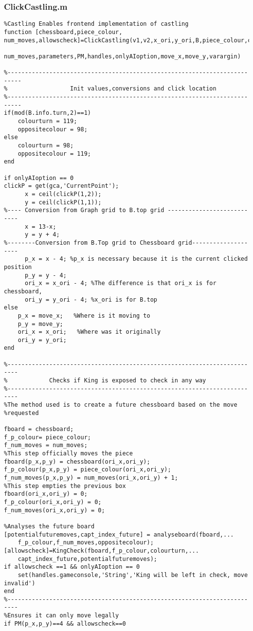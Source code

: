 \documentclass{article}
\begin{document}
\subsubsection{ClickCastling.m}
\begin{lstlisting}
%Castling Enables frontend implementation of castling
function [chessboard,piece_colour, num_moves,allowscheck]=ClickCastling(v1,v2,x_ori,y_ori,B,piece_colour,chessboard,...
    num_moves,parameters,PM,handles,onlyAIoption,move_x,move_y,varargin)

%--------------------------------------------------------------------------
%                  Init values,conversions and click location
%--------------------------------------------------------------------------
if(mod(B.info.turn,2)==1)
    colourturn = 119;
    oppositecolour = 98;
else
    colourturn = 98;
    oppositecolour = 119;
end

if onlyAIoption == 0
clickP = get(gca,'CurrentPoint');
      x = ceil(clickP(1,2));
      y = ceil(clickP(1,1));
%---- Conversion from Graph grid to B.top grid ---------------------------
      x = 13-x;      
      y = y + 4;
%--------Conversion from B.Top grid to Chessboard grid--------------------
      p_x = x - 4; %p_x is necessary because it is the current clicked position
      p_y = y - 4;
      ori_x = x_ori - 4; %The difference is that ori_x is for chessboard,
      ori_y = y_ori - 4; %x_ori is for B.top
else
    p_x = move_x;   %Where is it moving to
    p_y = move_y;
    ori_x = x_ori;   %Where was it originally
    ori_y = y_ori;
end  

%-------------------------------------------------------------------------
%            Checks if King is exposed to check in any way
%-------------------------------------------------------------------------
%The method used is to create a future chessboard based on the move
%requested

fboard = chessboard;
f_p_colour= piece_colour;
f_num_moves = num_moves;
%This step officially moves the piece
fboard(p_x,p_y) = chessboard(ori_x,ori_y);
f_p_colour(p_x,p_y) = piece_colour(ori_x,ori_y);
f_num_moves(p_x,p_y) = num_moves(ori_x,ori_y) + 1;
%This step empties the previous box
fboard(ori_x,ori_y) = 0;
f_p_colour(ori_x,ori_y) = 0;
f_num_moves(ori_x,ori_y) = 0;

%Analyses the future board
[potentialfuturemoves,capt_index_future] = analyseboard(fboard,...
    f_p_colour,f_num_moves,oppositecolour);
[allowscheck]=KingCheck(fboard,f_p_colour,colourturn,...
    capt_index_future,potentialfuturemoves);
if allowscheck ==1 && onlyAIoption == 0
    set(handles.gameconsole,'String','King will be left in check, move invalid')
end
%-------------------------------------------------------------------------
%Ensures it can only move legally
if PM(p_x,p_y)==4 && allowscheck==0


\end{lstlisting}
\end{document}
